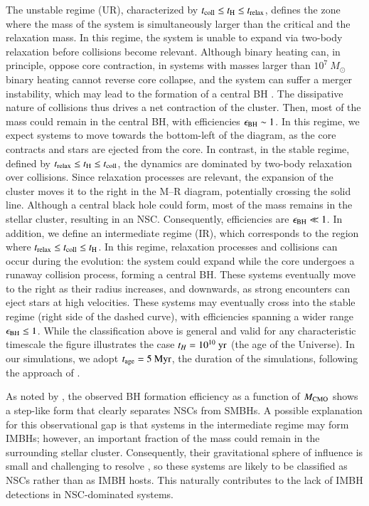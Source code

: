 The unstable regime (UR), characterized by $t_{\rm coll} \leq t_{\rm H} \leq t_{\rm relax}$, defines the zone where the mass of the system is simultaneously larger than the critical and the relaxation mass. In this regime, the system is unable to expand via two-body relaxation before collisions become relevant. Although binary heating can, in principle, oppose core contraction, in systems with masses larger than $10^7~M_{\odot}$ binary heating cannot reverse core collapse, and the system can suffer a merger instability, which may lead to the formation of a central BH \citep{lee1987dynamical}. The dissipative nature of collisions thus drives a net contraction of the cluster. Then, most of the mass could remain in the central BH, with efficiencies $\epsilon_{\rm BH} \sim 1$. In this regime, we expect systems to move towards the bottom-left of the diagram, as the core contracts and stars are ejected from the core. In contrast, in the stable regime, defined by $t_{\rm relax} \leq t_{\rm H} \leq t_{\rm coll}$, the dynamics are dominated by two-body relaxation over collisions. Since relaxation processes are relevant, the expansion of the cluster moves it to the right in the M--R diagram, potentially crossing the solid line. Although a central black hole could form, most of the mass remains in the stellar cluster, resulting in an NSC. Consequently, efficiencies are $\epsilon_{\rm BH} \ll 1$. In addition, we define an intermediate regime (IR), which corresponds to the region where $t_{\rm relax} \leq t_{\rm coll} \leq t_{\rm H}$. In this regime, relaxation processes and collisions can occur during the evolution: the system could expand while the core undergoes a runaway collision process, forming a central BH. These systems eventually move to the right as their radius increases, and downwards, as strong encounters can eject stars at high velocities. These systems may eventually cross into the stable regime (right side of the dashed curve), with efficiencies spanning a wider range $\epsilon_{\rm BH} \leq 1$. While the classification above is general and valid for any characteristic timescale the figure illustrates the case $t_H=10^{10}~{\rm yr}$ (the age of the Universe). In our simulations, we adopt $t_{\rm age} = 5~{\rm Myr}$, the duration of the simulations, following the approach of \citet{vergara2023global}.

As noted by \citet{escala2021observational}, the observed BH formation efficiency as a function of $M_{\rm CMO}$ shows a step-like form that clearly separates NSCs from SMBHs. A possible explanation for this observational gap is that systems in the intermediate regime may form IMBHs; however, an important fraction of the mass could remain in the surrounding stellar cluster. Consequently, their gravitational sphere of influence is small and challenging to resolve \citep{trenti2006dynamical}, so these systems are likely to be classified as NSCs rather than as IMBH hosts. This naturally contributes to the lack of IMBH detections in NSC-dominated systems.

